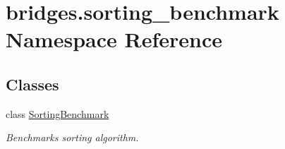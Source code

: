 \hypertarget{namespacebridges_1_1sorting__benchmark}{}\section{bridges.\+sorting\+\_\+benchmark Namespace Reference}
\label{namespacebridges_1_1sorting__benchmark}
\subsection*{Classes}
\begin{DoxyCompactItemize}
\item 
class \hyperlink{classbridges_1_1sorting__benchmark_1_1_sorting_benchmark}{Sorting\+Benchmark}
\begin{DoxyCompactList}\small\item\em Benchmarks sorting algorithm. \end{DoxyCompactList}\end{DoxyCompactItemize}
